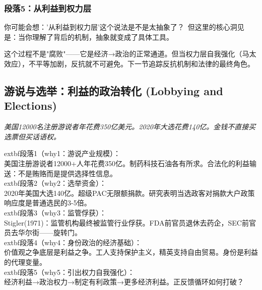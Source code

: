 \documentclass[a4paper,12pt]{book}
\newenvironment{motivation}{\begin{tcolorbox}[colback=gray!10,colframe=gray!60,title=\textit{本章动机},fonttitle=\bfseries,arc=0mm,leftrule=3mm]\small\itshape}{\end{tcolorbox}}
\begin{document}
\begin{motivation}
\begin{motivation}
\begin{motivation}
	\subsubsection*{段落5：从利益到权力层}

	\begin{tcolorbox}[colback=yellow!5, title=\textit{读者行为预测}]
		你可能会想：'从利益到权力层'这个说法是不是太抽象了？\ 但这里的核心洞见是：当你理解了背后的机制，抽象就变成了具体工具。
	\end{tcolorbox}

这个过程不是"腐败"——它是经济→政治的正常通道。但当权力层自我强化（马太效应），不平等加剧，反抗就不可避免。下一节追踪反抗机制和法律的最终角色。

	
	\subsection{游说与选举：利益的政治转化 (Lobbying and Elections)}
	\begin{motivation}美国12000名注册游说者年花费350亿美元。2020年大选花费140亿。金钱不直接买选票但买话语权。\end{motivation}
		extbf{段落1（why1：游说产业规模）}：\\美国注册游说者12000+人年花费350亿。制药科技石油各有所求。合法化的利益输送：不是贿赂而是提供选择性信息。\\	extbf{段落2（why2：选举资金）}：\\2020年美国大选140亿。超级PAC无限额捐款。研究表明当选政客对捐款大户政策响应度是普通选民的3-5倍。\\	extbf{段落3（why3：监管俘获）}：\\Stigler(1971)：监管机构最终被监管行业俘获。FDA前官员退休去药企，SEC前官员去华尔街——旋转门。\\	extbf{段落4（why4：身份政治的经济基础）}：\\价值观之争底层是利益之争。工人支持保护主义，精英支持自由贸易。身份是利益的代理变量。\\	extbf{段落5（why5：引出权力自我强化）}：\\经济利益→政治权力→制定有利政策→更多经济利益。正反馈循环如何打破？


\end{motivation}
\end{motivation}
\end{motivation}
\end{document}
